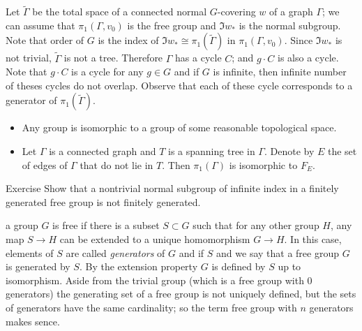 Let $\tilde\Gamma$ be the total space of a connected normal $G$-covering $w$ of a graph $\Gamma$;
we can assume that $\pi_1(\Gamma,v_0)$ is the free group and $\Im w_*$ is the normal subgroup.
Note that order of $G$ is the index of $\Im w_*\cong \pi_1(\tilde\Gamma)$ in $\pi_1(\Gamma,v_0)$.
Since $\Im w_*$ is not trivial, $\tilde\Gamma$ is not a tree.
Therefore $\Gamma$ has a cycle $C$; and $g\cdot C$ is also a cycle.
Note that $g\cdot C$ is a cycle for any $g\in G$ and if $G$ is infinite, then infinite number of theses cycles do not overlap.
Observe that each of these cycle corresponds to a generator of $\pi_1(\tilde\Gamma)$.
















\begin{itemize}
\item Any group is isomorphic to a group of some reasonable topological space.
\item Let $\Gamma$ is a connected graph and $T$ is a spanning tree in $\Gamma$.
Denote by $E$ the set of edges of $\Gamma$ that do not lie in $T$.
Then $\pi_1(\Gamma)$ is isomorphic to $F_E$.
\end{itemize}

\begin{thm}{Exercise}\label{ex:subgroup(free)}
Show that a nontrivial normal subgroup of infinite index in a finitely generated free group is not finitely generated.
\end{thm}



















a group $G$ is free if there is a subset $S\subset G$ such that for any other group $H$, any map $S\to H$ can be extended to a unique homomorphism $G\to H$.
In this case, elements of $S$ are called \emph{generators} of $G$ and if $S$ and we say that a free group $G$ is generated by $S$.
By the extension property $G$ is defined by $S$ up to isomorphism.
Aside from the trivial group (which is a free group with 0 generators) the generating set of a free group is not uniquely defined, but the sets of generators have the same cardinality; so the term free group with $n$ generators makes sence.

